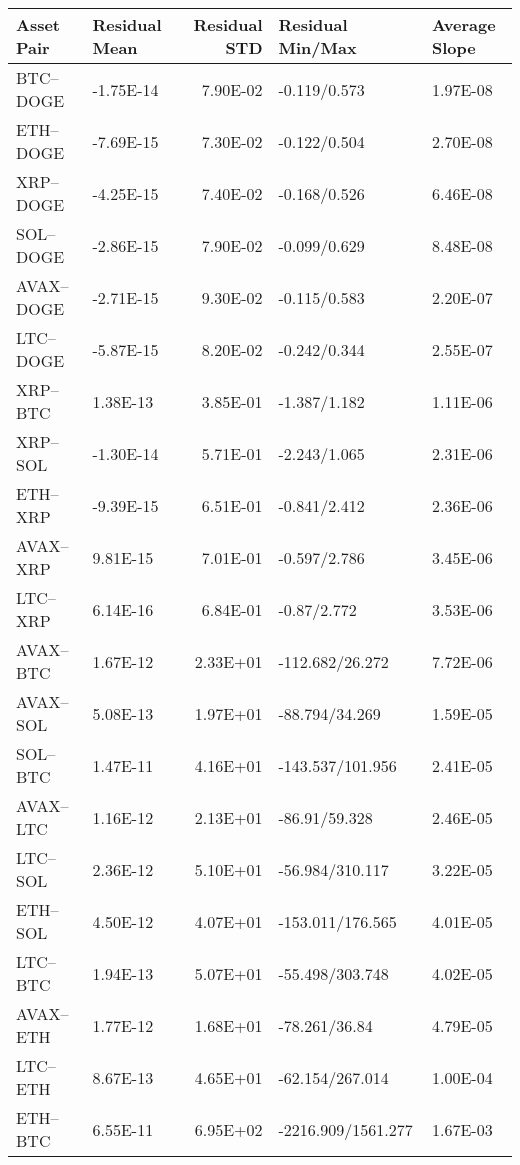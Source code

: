 \begin{tabular}{llrll}
\toprule
Asset Pair & Residual Mean & Residual STD & Residual Min/Max & Average Slope \\
\midrule
BTC–DOGE & -1.75E-14 & 7.90E-02 & -0.119/0.573 & 1.97E-08 \\
ETH–DOGE & -7.69E-15 & 7.30E-02 & -0.122/0.504 & 2.70E-08 \\
XRP–DOGE & -4.25E-15 & 7.40E-02 & -0.168/0.526 & 6.46E-08 \\
SOL–DOGE & -2.86E-15 & 7.90E-02 & -0.099/0.629 & 8.48E-08 \\
AVAX–DOGE & -2.71E-15 & 9.30E-02 & -0.115/0.583 & 2.20E-07 \\
LTC–DOGE & -5.87E-15 & 8.20E-02 & -0.242/0.344 & 2.55E-07 \\
XRP–BTC & 1.38E-13 & 3.85E-01 & -1.387/1.182 & 1.11E-06 \\
XRP–SOL & -1.30E-14 & 5.71E-01 & -2.243/1.065 & 2.31E-06 \\
ETH–XRP & -9.39E-15 & 6.51E-01 & -0.841/2.412 & 2.36E-06 \\
AVAX–XRP & 9.81E-15 & 7.01E-01 & -0.597/2.786 & 3.45E-06 \\
LTC–XRP & 6.14E-16 & 6.84E-01 & -0.87/2.772 & 3.53E-06 \\
AVAX–BTC & 1.67E-12 & 2.33E+01 & -112.682/26.272 & 7.72E-06 \\
AVAX–SOL & 5.08E-13 & 1.97E+01 & -88.794/34.269 & 1.59E-05 \\
SOL–BTC & 1.47E-11 & 4.16E+01 & -143.537/101.956 & 2.41E-05 \\
AVAX–LTC & 1.16E-12 & 2.13E+01 & -86.91/59.328 & 2.46E-05 \\
LTC–SOL & 2.36E-12 & 5.10E+01 & -56.984/310.117 & 3.22E-05 \\
ETH–SOL & 4.50E-12 & 4.07E+01 & -153.011/176.565 & 4.01E-05 \\
LTC–BTC & 1.94E-13 & 5.07E+01 & -55.498/303.748 & 4.02E-05 \\
AVAX–ETH & 1.77E-12 & 1.68E+01 & -78.261/36.84 & 4.79E-05 \\
LTC–ETH & 8.67E-13 & 4.65E+01 & -62.154/267.014 & 1.00E-04 \\
ETH–BTC & 6.55E-11 & 6.95E+02 & -2216.909/1561.277 & 1.67E-03 \\
\bottomrule
\end{tabular}
